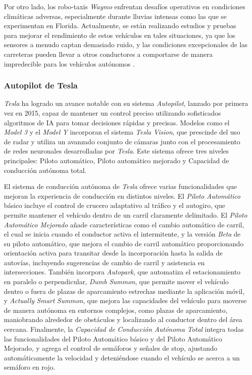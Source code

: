 Por otro lado, los robo-taxis \textit{Waymo} enfrentan desafíos operativos en condiciones climáticas adversas, especialmente durante lluvias intensas como las que se experimentan en Florida. Actualmente, se están realizando estudios y pruebas para mejorar el rendimiento de estos vehículos en tales situaciones, ya que los sensores a menudo captan demasiado ruido, y las condiciones excepcionales de las carreteras pueden llevar a otros conductores a comportarse de manera impredecible para los vehículos autónomos \cite{waymo-florida}.

\subsubsection{Autopilot de Tesla}

\textit{Tesla} ha logrado un avance notable con su sistema \textit{Autopilot}, lanzado por primera vez en 2015, capaz de mantener un control preciso utilizando sofisticados algoritmos de \ac{IA} para tomar decisiones rápidas y precisas. Modelos como el \textit{Model 3} y el \textit{Model Y} incorporan el sistema \textit{Tesla Vision}, que prescinde del uso de radar y utiliza un avanzado conjunto de cámaras junto con el procesamiento de redes neuronales desarrolladas por \textit{Tesla}. Este sistema ofrece tres niveles principales: Piloto automático, Piloto automático mejorado y Capacidad de conducción autónoma total.

El sistema de conducción autónoma de \textit{Tesla} ofrece varias funcionalidades que mejoran la experiencia de conducción en distintos niveles. El \textit{Piloto Automático} básico incluye el control de crucero adaptativo al tráfico y el autogiro, que permite mantener el vehículo dentro de un carril claramente delimitado. El \textit{Piloto Automático Mejorado} añade características como el cambio automático de carril, el cual se inicia cuando el conductor activa el intermitente, y la versión \textit{Beta} de su piloto automático, que mejora el cambio de carril automático proporcionando orientación activa para transitar desde la incorporación hasta la salida de autovías, incluyendo sugerencias de cambio de carril y asistencia en intersecciones. También incorpora \textit{Autopark}, que automatiza el estacionamiento en paralelo o perpendicular, \textit{Dumb Summon}, que permite mover el vehículo dentro o fuera de plazas de aparcamiento estrechas mediante la aplicación móvil, y \textit{Actually Smart Summon}, que mejora las capacidades del vehículo para moverse de manera autónoma en entornos complejos, como plazas de aparcamiento, maniobrando alrededor de obstáculos y localizando al conductor dentro del área cercana. Finalmente, la \textit{Capacidad de Conducción Autónoma Total} integra todas las funcionalidades del Piloto Automático básico y del Piloto Automático Mejorado, y agrega el control de semáforos y señales de stop, ajustando automáticamente la velocidad y deteniéndose cuando el vehículo se acerca a un semáforo en rojo.

